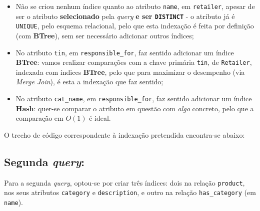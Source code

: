 \documentclass[12pt,a4paper]{article}
\begin{document}
\begin{itemize}
  \item Não se criou nenhum índice quanto ao atributo \texttt{name}, em \texttt{retailer},
        apesar de ser o atributo \textbf{selecionado} pela \textit{query} \textbf{e ser
          \texttt{DISTINCT}} - o atributo já é \texttt{UNIQUE}, pelo
        esquema relacional, pelo que esta indexação é feita por definição (com
        \textbf{BTree}), sem ser necessário adicionar outros índices;

  \item No atributo \texttt{tin}, em \texttt{responsible\_for}, faz sentido adicionar um
        índice \textbf{BTree}: vamos realizar comparações com a chave primária \texttt{tin},
        de \texttt{Retailer}, indexada com índices \textbf{BTree}, pelo que para maximizar
        o desempenho (via \textit{Merge Join}), é esta a indexação que faz sentido;

  \item No atributo \texttt{cat\_name}, em \texttt{responsible\_for}, faz sentido adicionar
        um índice \textbf{Hash}: quer-se comparar o atributo em questão com \textit{algo}
        concreto, pelo que a comparação em $O(1)$ é ideal.
\end{itemize}

O trecho de código correspondente à indexação pretendida encontra-se abaixo:



\subsection*{Segunda \textit{query}:}



Para a segunda \textit{query}, optou-se por criar três índices: dois na relação
\texttt{product}, nos seus atributos \texttt{category} e \texttt{description},
e outro na relação \texttt{has\_category} (em \texttt{name}).

\vspace*{0.25cm}
\end{document}
